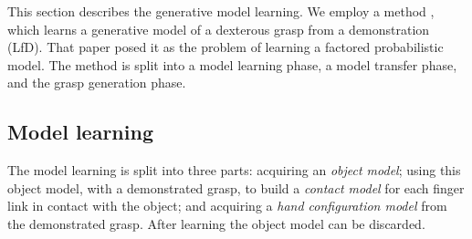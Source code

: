 This section describes the generative model learning. We employ a method \cite{kopicki2015ijrr}, which learns a generative model of a dexterous grasp from a demonstration (LfD). That paper posed it as the problem of learning a factored probabilistic model. The method is split into a model learning phase, a model transfer phase, and the grasp generation phase. 

\subsection{Model learning}
The model learning is split into three parts: acquiring an {\em object model}; using this object model, with a demonstrated grasp, to build a {\em contact model} for each finger link in contact with the object; and acquiring a {\em hand configuration model} from the demonstrated grasp. After learning the object model can be discarded.

